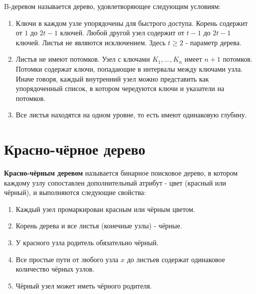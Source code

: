 {B-деревом называется дерево, удовлетворяющее следующим условиям:

\begin{enumerate}
  \item Ключи в каждом узле упорядочены для быстрого доступа.  
  Корень содержит от $1$ до $2t - 1$ ключей.  
  Любой другой узел содержит от $t - 1$ до $2t - 1$ ключей.  
  Листья не являются исключением.  
  Здесь $t \ge 2$ - параметр дерева.

  \item Листья не имеют потомков.  
  Узел с ключами $K_1, \ldots, K_n$ имеет $n + 1$ потомков.  
  Потомки содержат ключи, попадающие в интервалы между ключами узла.  
  Иначе говоря, каждый внутренний узел можно представить как упорядоченный список, в котором чередуются ключи и указатели на потомков.

  \item Все листья находятся на одном уровне, то есть имеют одинаковую глубину.
\end{enumerate}



	\section*{Красно-чёрное дерево}

\textbf{Красно-чёрным деревом} называется бинарное поисковое дерево, в котором каждому узлу сопоставлен дополнительный атрибут - цвет (красный или чёрный), и выполняются следующие свойства:

\begin{enumerate}
  \item Каждый узел промаркирован красным или чёрным цветом.

  \item Корень дерева и все листья (конечные узлы) - чёрные.

  \item У красного узла родитель обязательно чёрный.

  \item Все простые пути от любого узла $x$ до листьев содержат одинаковое количество чёрных узлов.

  \item Чёрный узел может иметь чёрного родителя.
\end{enumerate}


    \newpage
}

